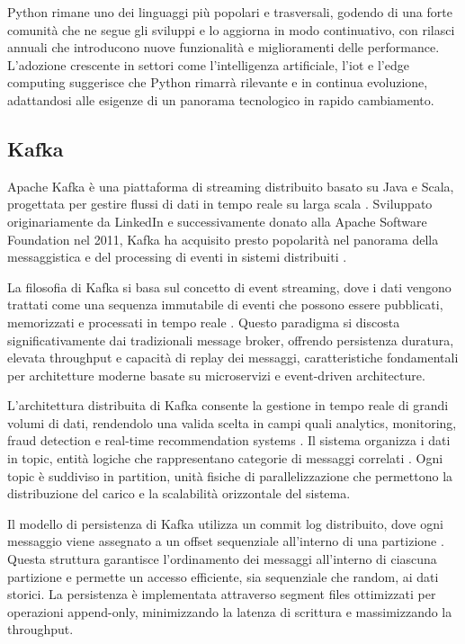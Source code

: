 Python rimane uno dei linguaggi più popolari e trasversali, godendo di una forte comunità che ne segue gli sviluppi e lo
aggiorna in modo continuativo, con rilasci annuali che introducono nuove funzionalità e miglioramenti delle performance.
L'adozione crescente in settori come l'intelligenza artificiale, l'\acrfull{iot} e l'edge computing suggerisce che
Python rimarrà rilevante e in continua evoluzione, adattandosi alle esigenze di un panorama tecnologico
in rapido cambiamento.

\subsection{Kafka}

Apache Kafka è una piattaforma di streaming distribuito basato su Java e Scala, progettata per gestire flussi di dati
in tempo reale su larga scala \cite{narkhede2017kafka}. Sviluppato originariamente da LinkedIn e successivamente
donato alla Apache Software Foundation nel 2011, Kafka ha acquisito presto popolarità nel panorama
della messaggistica e del processing di eventi in sistemi distribuiti \cite{garg2013apache}.

La filosofia di Kafka si basa sul concetto di event streaming, dove i dati vengono trattati come una sequenza immutabile
di eventi che possono essere pubblicati, memorizzati e processati in tempo reale \cite{stopford2018designing}.
Questo paradigma si discosta significativamente dai tradizionali message broker, offrendo persistenza duratura,
elevata throughput e capacità di replay dei messaggi, caratteristiche fondamentali per architetture moderne
basate su microservizi e event-driven architecture.

L'architettura distribuita di Kafka consente la gestione in tempo reale di grandi volumi di dati,
rendendolo una valida scelta in campi quali analytics, monitoring, fraud detection e real-time recommendation systems
\cite{kreps2014kafka}. Il sistema organizza i dati in topic, entità logiche che rappresentano categorie di messaggi
correlati \cite{narkhede2017kafka}. Ogni topic è suddiviso in partition, unità fisiche di parallelizzazione
che permettono la distribuzione del carico e la scalabilità orizzontale del sistema.

Il modello di persistenza di Kafka utilizza un commit log distribuito, dove ogni messaggio viene assegnato a un offset
sequenziale all'interno di una partizione \cite{garg2013apache}. Questa struttura garantisce l'ordinamento dei messaggi
all'interno di ciascuna partizione e permette un accesso efficiente, sia sequenziale che random, ai dati storici.
La persistenza è implementata attraverso segment files ottimizzati per operazioni append-only, minimizzando la latenza
di scrittura e massimizzando la throughput.

